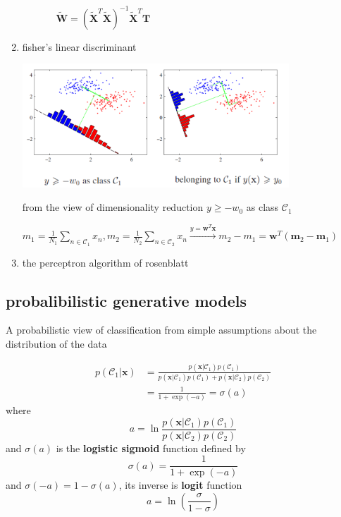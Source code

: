 \documentclass[11pt]{article}
\newcommand{\bl}[1] {\boldsymbol{#1}}
\begin{document}
\begin{enumerate}
\begin{itemize}
\begin{itemize}
\(\bl{\widetilde{W}}=(\bl{\widetilde{X}}^T\bl{\widetilde{X}})^{-1}\bl{\widetilde{X}}^T\bl{T}\)
\end{itemize}
\end{itemize}
\item fisher's linear discriminant
\label{sec:org77ad6be}

\includegraphics[width=100mm]{Fisher}

from the view of dimensionality reduction
\(y\ge -w_0\) as class \(\mathcal{C}_1\)

\(m_1=\frac{1}{N_1}\displaystyle\sum_{n\in\mathcal{C}_1}x_n, 
     m_2=\frac{1}{N_2}\displaystyle\sum_{n\in\mathcal{C}_2}x_n
     \xrightarrow{y=\bl{w}^T\bl{x}} m_2-m_1=\bl{w}^T(\bl{m}_2-\bl{m}_1)\)
\item the perceptron algorithm of rosenblatt
\label{sec:org636bbc8}
\end{enumerate}
\subsection{probalibilistic generative models}
\label{sec:orgda0dcd5}
A probabilistic view of classification from simple assumptions about the
distribution of the data

\begin{align*}
p(\mathcal{C}_1|\bl{x})&=\frac{p(\bl{x}|\mathcal{C}_1)p(\mathcal{C}_1)}
{p(\bl{x}|\mathcal{C}_1)p(\mathcal{C}_1)+p(\bl{x}|\mathcal{C}_2)p(\mathcal{C}_2)}\\
&=\frac{1}{1+\exp(-a)}=\sigma(a)
\end{align*}
where 
\begin{equation*}
a=\ln\frac{p(\bl{x}|\mathcal{C}_1)p(\mathcal{C}_1)}
{p(\bl{x}|\mathcal{C}_2)p(\mathcal{C}_2)}
\end{equation*}
and \(\sigma(a)\) is the \textbf{logistic sigmoid} function defined by
\begin{equation*}
\sigma(a)=\frac{1}{1+\exp(-a)}
\end{equation*}
and \(\sigma(-a)=1-\sigma(a)\), its inverse is \textbf{logit} function
\begin{equation*}
a=\ln(\frac{\sigma}{1-\sigma})
\end{equation*}
\end{document}
